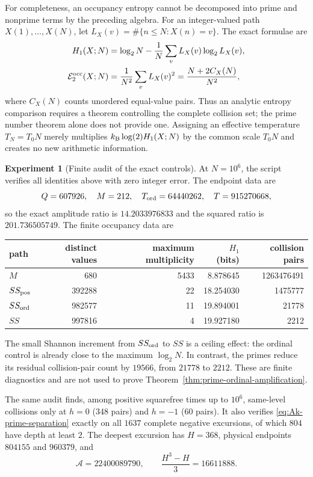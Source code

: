 \documentclass[11pt]{amsart}
\numberwithin{equation}{section}
\theoremstyle{plain}
\theoremstyle{definition}
\newtheorem{experiment}[theorem]{Experiment}
\theoremstyle{remark}
\begin{document}
For completeness, an occupancy entropy cannot be decomposed into prime and
nonprime terms by the preceding algebra.  For an integer-valued path $X(1),
\ldots,X(N)$, let $L_X(v)=\#\{n\le N:X(n)=v\}$.  The exact formulae are
\begin{align}
H_1(X;N)&=\log_2N-\frac1N\sum_vL_X(v)\log_2L_X(v),
\label{eq:occupancy-shannon}\\
\mathcal E^{\rm occ}_2(X;N)&=\frac1{N^2}\sum_vL_X(v)^2
=\frac{N+2C_X(N)}{N^2},
\label{eq:occupancy-collision}
\end{align}
where $C_X(N)$ counts unordered equal-value pairs.  Thus an analytic entropy
comparison requires a theorem controlling the complete collision set; the
prime number theorem alone does not provide one.  Assigning an effective
temperature $T_N=T_0N$ merely multiplies
$k_{\rm B}\log(2)H_1(X;N)$ by the common scale $T_0N$ and creates no new
arithmetic information.

\begin{experiment}[Finite audit of the exact controls]
\label{exp:v11-entropy-controls}
At $N=10^6$, the script
 verifies all identities above
with zero integer error.  The endpoint data are
\begin{equation}
\label{eq:v11-endpoint-amplification}
Q=607926,\quad M=212,\quad
T_{\rm ord}=64440262,\quad T=915270668,
\end{equation}
so the exact amplitude ratio is $14.2033976833$ and the squared ratio is
$201.736505749$.  The finite occupancy data are
\begin{center}
\begin{tabular}{lrrrr}
\toprule
path & distinct values & maximum multiplicity & $H_1$ (bits) & collision pairs\\
\midrule
$M$ & 680 & 5433 & 8.878645 & 1263476491\\
$SS_{\rm pos}$ & 392288 & 22 & 18.254030 & 1475777\\
$SS_{\rm ord}$ & 982577 & 11 & 19.894001 & 21778\\
$SS$ & 997816 & 4 & 19.927180 & 2212\\
\bottomrule
\end{tabular}
\end{center}
The small Shannon increment from $SS_{\rm ord}$ to $SS$ is a ceiling effect:
the ordinal control is already close to the maximum $\log_2N$.  In contrast,
the primes reduce its residual collision-pair count by $19566$, from $21778$
to $2212$.  These are
finite diagnostics and are not used to prove
Theorem~\ref{thm:prime-ordinal-amplification}.

The same audit finds, among positive squarefree times up to $10^6$, same-level
collisions only at $h=0$ (348 pairs) and $h=-1$ (60 pairs).  It also verifies
\eqref{eq:Ak-prime-separation} exactly on all $1637$ complete negative
excursions, of which $804$ have depth at least $2$.  The deepest excursion has
$H=368$, physical endpoints $804155$ and $960379$, and
\begin{equation}
\label{eq:v11-deepest-excursion}
\mathcal A=22400089790,
\qquad
\frac{H^3-H}{3}=16611888.
\end{equation}
\end{experiment}
\end{document}
